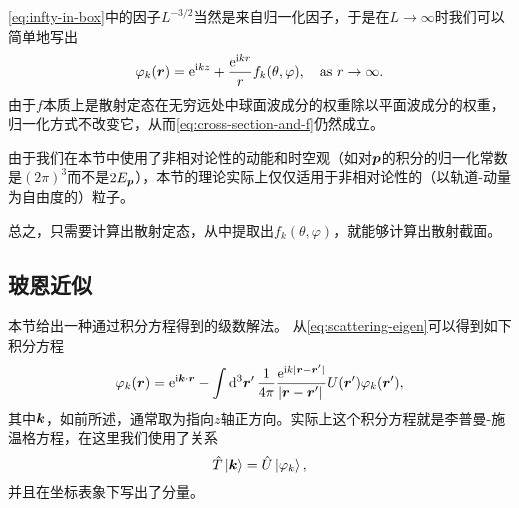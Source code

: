 \documentclass[UTF8, a4paper]{ctexart}
\newcommand*{\ee}{\mathrm{e}}
\newcommand*{\ii}{\mathrm{i}}
\begin{document}
\eqref{eq:infty-in-box}中的因子$L^{-3/2}$当然是来自归一化因子，于是在$L \to \infty$时我们可以简单地写出
\begin{equation}
    \varphi_k(\vb*{r}) = \ee^{\ii k z} + \frac{\ee^{\ii k r}}{r} f_k(\theta, \varphi) , \quad \text{as $r \to \infty$}.
\end{equation}
由于$f$本质上是散射定态在无穷远处中球面波成分的权重除以平面波成分的权重，归一化方式不改变它，从而\eqref{eq:cross-section-and-f}仍然成立。

由于我们在本节中使用了非相对论性的动能和时空观（如对$\vb*{p}$的积分的归一化常数是$(2\pi)^3$而不是$2E_{\vb*{p}}$），本节的理论实际上仅仅适用于非相对论性的（以轨道-动量为自由度的）粒子。

总之，只需要计算出散射定态，从中提取出$f_k(\theta, \varphi)$，就能够计算出散射截面。

\subsection{玻恩近似}

本节给出一种通过积分方程得到的级数解法。
从\eqref{eq:scattering-eigen}可以得到如下积分方程
\begin{equation}
    \varphi_k(\vb*{r}) = \ee^{\ii \vb*{k} \cdot \vb*{r}} - \int \dd[3]{\vb*{r}'} \frac{1}{4\pi} \frac{\ee^{\ii k \abs*{\vb*{r} - \vb*{r}'}}}{\abs*{\vb*{r} - \vb*{r}'}} U(\vb*{r}') \varphi_k(\vb*{r}'),
    \label{eq:born-eq}
\end{equation}
其中$\vb*{k}$，如前所述，通常取为指向$z$轴正方向。实际上这个积分方程就是李普曼-施温格方程，在这里我们使用了关系
\[
    \hat{T} \ket*{\vb*{k}} = \hat{U} \ket*{\varphi_k},
\]
并且在坐标表象下写出了分量。
\end{document}
